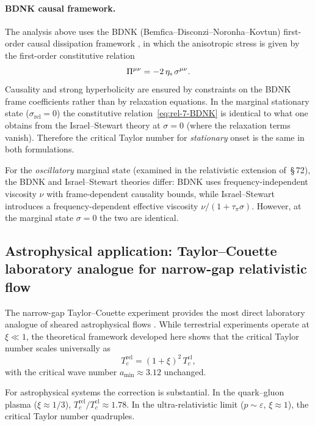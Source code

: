 \paragraph{BDNK causal framework.}
The analysis above uses the BDNK (Bemfica--Disconzi--Noronha--Kovtun)
first-order causal dissipation framework
\citep{BemficaDN2018,Kovtun2019}, in which the anisotropic stress is
given by the first-order constitutive relation
\begin{equation}
\label{eq:rel-7-BDNK}
\Pi^{\mu\nu} = -2\,\eta_{\mathrm{s}}\,\sigma^{\mu\nu}.
\end{equation}
Causality and strong hyperbolicity are ensured by constraints on the
BDNK frame coefficients rather than by relaxation equations.  In the
marginal stationary state ($\sigma_{\mathrm{rel}} = 0$) the
constitutive relation~\eqref{eq:rel-7-BDNK} is identical to what
one obtains from the Israel--Stewart theory at $\sigma=0$ (where
the relaxation terms vanish).  Therefore the critical Taylor number
for \emph{stationary} onset is the same in both formulations.

For the \emph{oscillatory} marginal state (examined in the
relativistic extension of~\S\,72), the BDNK and Israel--Stewart
theories differ: BDNK uses frequency-independent viscosity $\nu$
with frame-dependent causality bounds, while Israel--Stewart
introduces a frequency-dependent effective viscosity
$\nu/(1+\tau_{\pi}\sigma)$.  However, at the marginal state
$\sigma=0$ the two are identical.

\subsection{Astrophysical application: Taylor--Couette laboratory
  analogue for narrow-gap relativistic flow}
\label{sec:rel-71-lab-analog}

The narrow-gap Taylor--Couette experiment provides the most direct
laboratory analogue of sheared astrophysical flows
\citep{Donnelly1991,JiGoodmanKageyama2001}.  While terrestrial
experiments operate at $\xi\ll 1$, the theoretical framework developed
here shows that the critical Taylor number scales universally as
\begin{equation}
\label{eq:rel-7-275}
T_{c}^{\mathrm{rel}} = (1+\xi)^{2}\,T_{c}^{\mathrm{cl}},
\end{equation}
with the critical wave number $a_{\min}\approx 3.12$ unchanged.

For astrophysical systems the correction is substantial.  In the
quark--gluon plasma ($\xi\approx 1/3$),
$T_{c}^{\mathrm{rel}}/T_{c}^{\mathrm{cl}}\approx 1.78$.  In the
ultra-relativistic limit ($p\sim\varepsilon$, $\xi\approx 1$), the
critical Taylor number quadruples.


